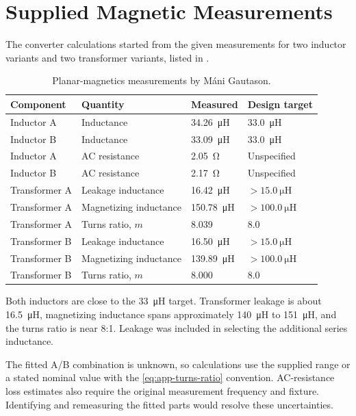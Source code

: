 \section{Supplied Magnetic Measurements}
\label{sec:mag-inherited}

The converter calculations started from the given measurements for two inductor variants and two transformer variants, listed in .

\begin{table}[htbp]
\centering
\caption{Planar-magnetics measurements by M\'ani Gautason.}
\label{tab:mag-inherited-measurements}
\begin{tabularx}{\textwidth}{@{}p{}Xp{}p{}@{}}
\toprule
Component & Quantity & Measured & Design target\\
\midrule
Inductor A & Inductance & \SI{34.26}{\micro\henry} & \SI{33.0}{\micro\henry}\\
Inductor B & Inductance & \SI{33.09}{\micro\henry} & \SI{33.0}{\micro\henry}\\
Inductor A & AC resistance & \SI{2.05}{\ohm} & Unspecified\\
Inductor B & AC resistance & \SI{2.17}{\ohm} & Unspecified\\
\midrule
Transformer A & Leakage inductance & \SI{16.42}{\micro\henry} & \(>\SI{15.0}{\micro\henry}\)\\
Transformer A & Magnetizing inductance & \SI{150.78}{\micro\henry} & \(>\SI{100.0}{\micro\henry}\)\\
Transformer A & Turns ratio, \(m\) & 8.039 & 8.0\\
Transformer B & Leakage inductance & \SI{16.50}{\micro\henry} & \(>\SI{15.0}{\micro\henry}\)\\
Transformer B & Magnetizing inductance & \SI{139.89}{\micro\henry} & \(>\SI{100.0}{\micro\henry}\)\\
Transformer B & Turns ratio, \(m\) & 8.000 & 8.0\\
\bottomrule
\end{tabularx}
\end{table}

Both inductors are close to the \SI{33}{\micro\henry} target. Transformer leakage is about \SI{16.5}{\micro\henry}, magnetizing inductance spans approximately \SI{140}{\micro\henry} to \SI{151}{\micro\henry}, and the turns ratio is near 8:1. Leakage was included in selecting the additional series inductance.

The fitted A/B combination is unknown, so calculations use the supplied range or a stated nominal value with the \cref{eq:app-turns-ratio} convention. AC-resistance loss estimates also require the original measurement frequency and fixture. Identifying and remeasuring the fitted parts would resolve these uncertainties.
